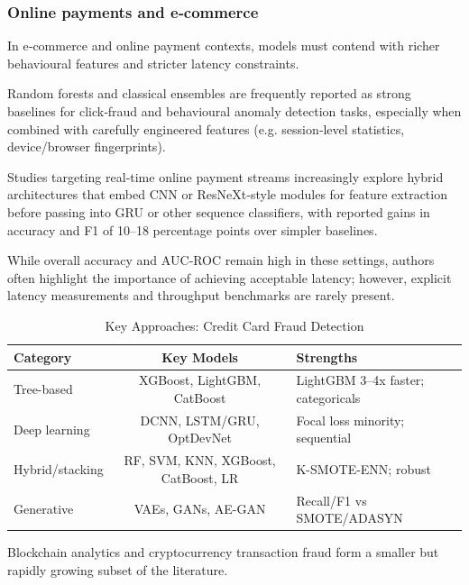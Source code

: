 \documentclass[a4paper,fleqn]{cas-dc}
\begin{document}
\subsubsection{Online payments and e‑commerce}
In e‑commerce and online payment contexts, models must contend with richer behavioural features and stricter latency constraints.

Random forests and classical ensembles are frequently reported as strong baselines for click‑fraud and behavioural anomaly detection tasks, especially when combined with carefully engineered features (e.g. session‑level statistics, device/browser fingerprints).

Studies targeting real‑time online payment streams increasingly explore hybrid architectures that embed CNN or ResNeXt‑style modules for feature extraction before passing into GRU or other sequence classifiers, with reported gains in accuracy and F1 of 10–18 percentage points over simpler baselines.

While overall accuracy and AUC‑ROC remain high in these settings, authors often highlight the importance of achieving acceptable latency; however, explicit latency measurements and throughput benchmarks are rarely present.

\begin{table}[htbp]
\centering
\caption{Key Approaches: Credit Card Fraud Detection}
\label{tab:credit-card-approaches}
\footnotesize
\begin{tabular}{lcp{6cm}}
\toprule
\textbf{Category} & \textbf{Key Models} & \textbf{Strengths} \\
\midrule
Tree-based & XGBoost, LightGBM, CatBoost & LightGBM 3--4x faster; categoricals \cite{el_barakaz_optimization_2022, zhao_improved_2024}\\
Deep learning & DCNN, LSTM/GRU, OptDevNet & Focal loss minority; sequential \cite{karthika_smart_2023, femila_roseline_autonomous_2022} \\
Hybrid/stacking & RF, SVM, KNN, XGBoost, CatBoost, LR & K-SMOTE-ENN; robust \cite{talukder_integrated_2024, talukder_securing_2024} \\
Generative & VAEs, GANs, AE-GAN & Recall/F1 vs SMOTE/ADASYN  \cite{tayebi_generative_2025, cakir_enhanced_2024} \\
\bottomrule
\end{tabular}
\end{table}

Blockchain analytics and cryptocurrency transaction fraud form a smaller but rapidly growing subset of the literature.
\end{document}
